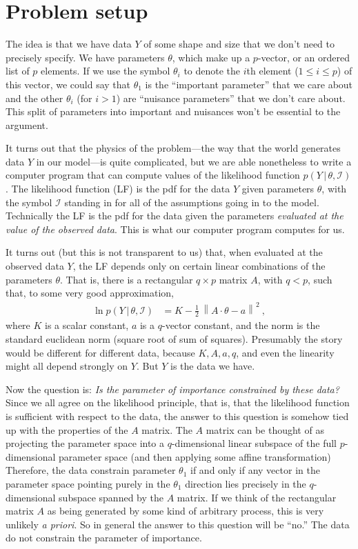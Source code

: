 \documentclass[10pt]{article}
\newcommand{\foreign}[1]{\textsl{#1}}
\newcommand{\given}{\,|\,}
\newcommand{\norm}[1]{\left\lVert{#1}\right\rVert}
\begin{document}
\section{Problem setup}
The idea is that we have data $Y$ of some shape and size that we don't need to precisely specify.
We have parameters $\theta$, which make up a $p$-vector, or an ordered list of $p$ elements.
If we use the symbol $\theta_i$ to denote the $i$th element ($1\leq i\leq p$) of this vector, we could say that $\theta_1$ is the ``important parameter'' that we care about and the other $\theta_i$ (for $i>1$) are ``nuisance parameters'' that we don't care about.
This split of parameters into important and nuisances won't be essential to the argument.

It turns out that the physics of the problem---the way that the world generates data $Y$ in our model---is quite complicated, but we are able nonetheless to write a computer program that can compute values of the likelihood function $p(Y\given \theta,\mathscr{I})$.
The likelihood function (LF) is the pdf for the data $Y$ given parameters $\theta$, with the symbol $\mathscr{I}$ standing in for all of the assumptions going in to the model.
Technically the LF is the pdf for the data given the parameters \emph{evaluated at the value of the observed data}.
This is what our computer program computes for us.

It turns out (but this is not transparent to us) that, when evaluated at the observed data $Y$, the LF depends only on certain linear combinations of the parameters $\theta$.
That is, there is a rectangular $q\times p$ matrix $A$, with $q<p$, such that, to some very good approximation,
\begin{align}
    \ln p(Y\given\theta,\mathscr{I}) &= K - \frac{1}{2}\,\norm{A\cdot\theta - a}^2 ~,
\end{align}
where $K$ is a scalar constant, $a$ is a $q$-vector constant, and the norm is the standard euclidean norm (square root of sum of squares).
Presumably the story would be different for different data, because $K, A, a, q$, and even the linearity might all depend strongly on $Y$.
But $Y$ is the data we have.

Now the question is: \emph{Is the parameter of importance constrained by these data?}
Since we all agree on the likelihood principle, that is, that the likelihood function is sufficient with respect to the data,
the answer to this question is somehow tied up with the properties of the $A$ matrix.
The $A$ matrix can be thought of as projecting the parameter space into a $q$-dimensional linear subspace of the full $p$-dimensional parameter space (and then applying some affine transformation)
Therefore, the data constrain parameter $\theta_1$ if and only if any vector in the parameter space pointing purely in the $\theta_1$ direction lies precisely in the $q$-dimensional subspace spanned by the $A$ matrix.
If we think of the rectangular matrix $A$ as being generated by some kind of arbitrary process, this is very unlikely \foreign{a priori}.
So in general the answer to this question will be ``no.''
The data do not constrain the parameter of importance.
\end{document}
